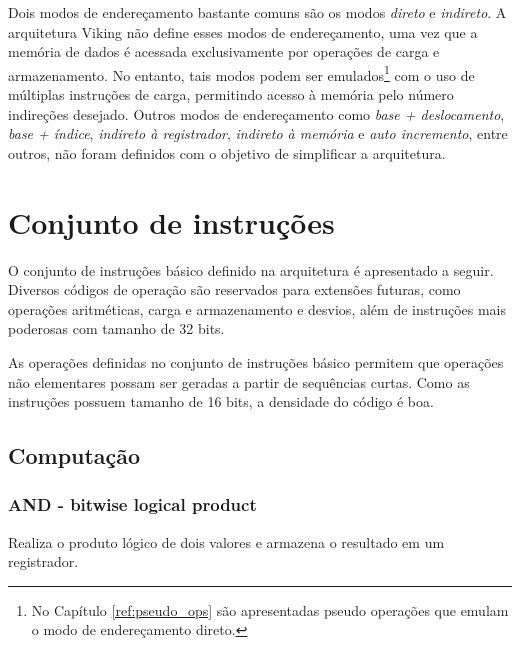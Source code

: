 \documentclass{extreport}
\begin{document}
Dois modos de endereçamento bastante comuns são os modos \textit{direto} e \textit{indireto}. A arquitetura Viking não define esses modos de endereçamento, uma vez que a memória de dados é acessada exclusivamente por operações de carga e armazenamento. No entanto, tais modos podem ser emulados\footnote{No Capítulo \ref{ref:pseudo_ops} são apresentadas pseudo operações que emulam o modo de endereçamento direto.} com o uso de múltiplas instruções de carga, permitindo acesso à memória pelo número indireções desejado. Outros modos de endereçamento como \textit{base + deslocamento}, \textit{base + índice}, \textit{indireto à registrador}, \textit{indireto à memória} e \textit{auto incremento}, entre outros, não foram definidos com o objetivo de simplificar a arquitetura.

\section{Conjunto de instruções}

O conjunto de instruções básico definido na arquitetura é apresentado a seguir. Diversos códigos de operação são reservados para extensões futuras, como operações aritméticas, carga e armazenamento e desvios, além de instruções mais poderosas com tamanho de 32 bits.

As operações definidas no conjunto de instruções básico permitem que operações não elementares possam ser geradas a partir de sequências curtas. Como as instruções possuem tamanho de 16 bits, a densidade do código é boa.

\subsection{Computação}

\subsubsection{AND - bitwise logical product}
Realiza o produto lógico de dois valores e armazena o resultado em um registrador.
\end{document}
